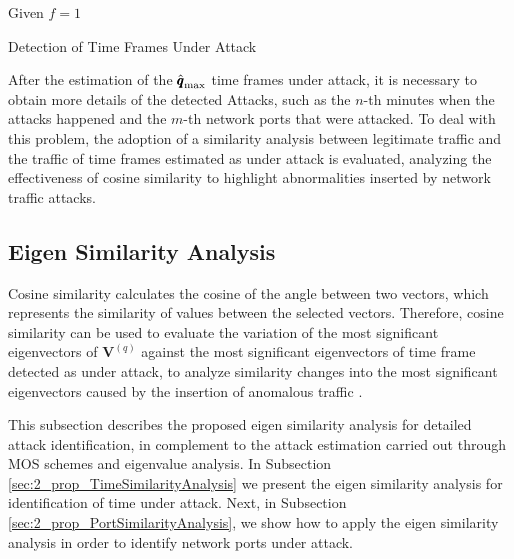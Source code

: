 \begin{algorithm}
	\label{alg:2.01}
	\SetAlgoLined
	Given $f = 1$\;
	\caption{Detection of Time Frames Under Attack}
\end{algorithm}

After the estimation of the $\rm{\hat{\pmb{q}}}_{\rm max}$ time frames under attack, it is necessary to obtain more details of the detected Attacks, such as the $n$-th minutes when the attacks happened and the $m$-th network ports that were attacked. To deal with this problem, the adoption of a similarity analysis between legitimate traffic and the traffic of time frames estimated as under attack is evaluated, analyzing the effectiveness of cosine similarity to highlight abnormalities inserted by network traffic attacks. 

\subsection{Eigen Similarity Analysis}
\label{sec:2_prop_EigenSimilarityAnalysis}

Cosine similarity calculates the cosine of the angle between two vectors, which represents the similarity of values between the selected vectors. Therefore, cosine similarity can be used to evaluate the variation of the most significant eigenvectors of $\pmb{V}^{(q)}$ against the most significant eigenvectors of time frame detected as under attack, to analyze similarity changes into the most significant eigenvectors caused by the insertion of anomalous traffic \cite{Lee2013}. 

This subsection describes the proposed eigen similarity analysis for detailed attack identification, in complement to the attack estimation carried out through MOS schemes and eigenvalue analysis. In Subsection \ref{sec:2_prop_TimeSimilarityAnalysis} we present the eigen similarity analysis for identification of time under attack. Next, in Subsection \ref{sec:2_prop_PortSimilarityAnalysis}, we show how to apply the eigen similarity analysis in order to identify network ports under attack.

